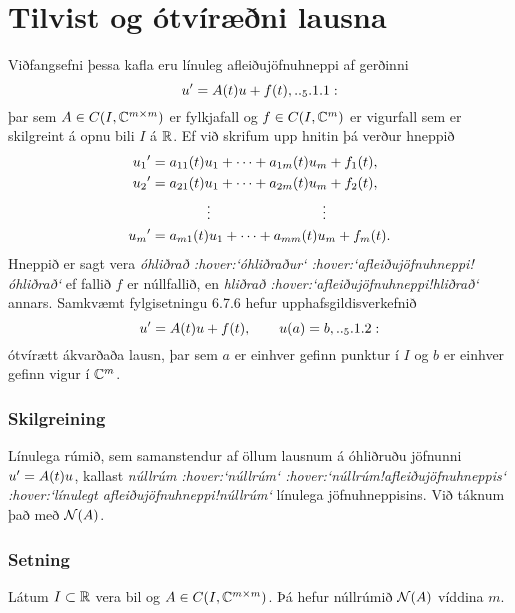 \section {Tilvist og ótvíræðni lausna}


\noindent
Viðfangsefni þessa kafla eru línuleg afleiðujöfnuhneppi  af gerðinni
 \begin{equation*}u\dash=A(t)u+f(t),

.. _5.1.1:

 \end{equation*}
þar sem $A\in C(I,{\mathbb C}^{m\times m})$ er fylkjafall og $f\in C(I,{\mathbb C}^m)$ 
er vigurfall sem er skilgreint á opnu bili $I$ á ${\mathbb R}$.  Ef við skrifum upp
hnitin þá verður hneppið 
\begin{align*}
u_1{\sp{\prime}}&=a_{11}(t)u_1+\cdots+a_{1m}(t)u_m+f_1(t),\\
u_2{\sp{\prime}}&=a_{21}(t)u_1+\cdots+a_{2m}(t)u_m+f_2(t),\\
&\qquad \qquad \vdots\qquad \qquad \qquad \qquad \vdots\\
u_m{\sp{\prime}}&=a_{m1}(t)u_1+\cdots+a_{mm}(t)u_m+f_m(t).
\end{align*}
Hneppið er sagt vera {\it
óhliðrað :hover:`óhliðraður` :hover:`afleiðujöfnuhneppi!óhliðrað`} ef
fallið $f$ er núllfallið, en {\it
hliðrað :hover:`afleiðujöfnuhneppi!hliðrað`} annars.   Samkvæmt
fylgisetningu 6.7.6  hefur upphafsgildisverkefnið
\begin{equation*}
u\dash=A(t)u+f(t), \qquad u(a)=b,

.. _5.1.2:

\end{equation*}
ótvírætt ákvarðaða lausn, þar sem $a$ er einhver gefinn punktur í $I$
og $b$ er einhver gefinn vigur í ${\mathbb C}^m$.  

\subsubsection{Skilgreining}
Línulega rúmið, sem samanstendur af öllum lausnum á óhliðruðu
jöfnunni $u{\sp{\prime}}=A(t)u$, kallast {\it
núllrúm :hover:`núllrúm` :hover:`núllrúm!afleiðujöfnuhneppis`
 :hover:`línulegt afleiðujöfnuhneppi!núllrúm`} línulega
jöfnuhneppisins.  Við táknum það með ${\cal N}(A)$.



\subsubsection{Setning}
Látum $I\subset {\mathbb R}$ vera bil og $A\in C(I,{\mathbb C}\sp
{m\times m})$. Þá hefur núllrúmið ${\cal N}(A)$ víddina $m$.


